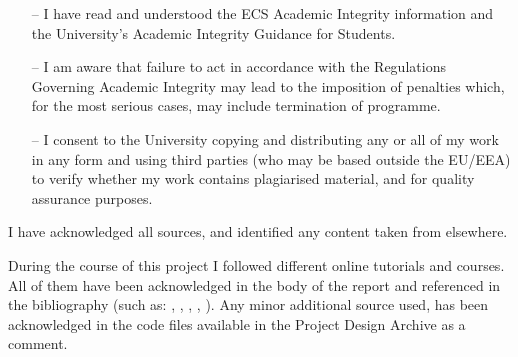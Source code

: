 \newpage
{}

\begin{StatementofOriginality}

% 
% 


\begin{itemize}
\item[--] I have read and understood the ECS Academic Integrity information and the University's Academic Integrity Guidance for Students.
\item[--] I am aware that failure to act in accordance with the Regulations Governing Academic Integrity may lead to the imposition of penalties which, for the most serious cases, may include termination of programme.
\item[--]  I consent to the University copying and distributing any or all of my work in any form and using third parties (who may be based outside the EU/EEA) to verify whether my work contains plagiarised material, and for quality assurance purposes.
\end{itemize}
 
\vskip5pt

\begin{tcolorbox}
I have acknowledged all sources, and identified any content taken from elsewhere.
\end{tcolorbox}

\vskip10pt
\begin{tcolorbox}
During the course of this project I followed different online tutorials and courses. All of them have been acknowledged in the body of the report and referenced in the bibliography (such as: \cite{why}, \cite{physics}, \cite{tds}, \cite{immune}, \cite{atom}). Any minor additional source used, has been acknowledged in the code files available in the Project Design Archive as a comment. 
\end{tcolorbox}


\end{StatementofOriginality}
